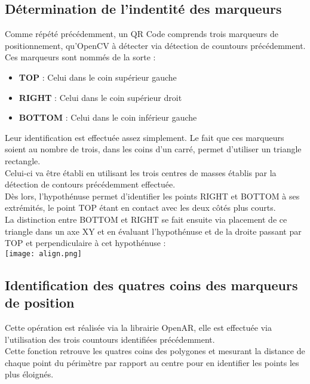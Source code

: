 \documentclass{report}
\begin{document}
		\subsection{Détermination de l'indentité des marqueurs}

			Comme répété précédemment, un QR Code comprends trois marqueurs de positionnement, qu'OpenCV à détecter via détection de countours précédemment.\\

			Ces marqueurs sont nommés de la sorte : \\

			\begin{itemize}
				\item \textbf{TOP} : Celui dans le coin supérieur gauche
				\item \textbf{RIGHT} : Celui dans le coin supérieur droit
				\item \textbf{BOTTOM} : Celui dans le coin inférieur gauche\\
			\end{itemize}

			Leur identification est effectuée assez simplement. Le fait que ces marqueurs soient au nombre de trois, dans les coins d'un carré, permet d'utiliser un triangle rectangle.\\
			Celui-ci va être établi en utilisant les trois centres de masses établis par la détection de contours précédemment effectuée.\\
			Dès lors, l'hypothénuse permet d'identifier les points RIGHT et BOTTOM à ses extrémités, le point TOP étant en contact avec les deux côtés plus courts.\\

			La distinction entre BOTTOM et RIGHT se fait ensuite via placement de ce triangle dans un axe XY et en évaluant l'hypothénuse et de la droite passant par TOP et perpendiculaire à cet hypothénuse : \\

			\texttt{[image: align.png]}

		\subsection{Identification des quatres coins des marqueurs de position}

			Cette opération est réalisée via la librairie OpenAR, elle est effectuée via l'utilisation des trois countours identifiées précédemment.\\
			Cette fonction retrouve les quatres coins des polygones et mesurant la distance de chaque point du périmètre par rapport au centre pour en identifier les points les plus éloignés.\\
\end{document}
